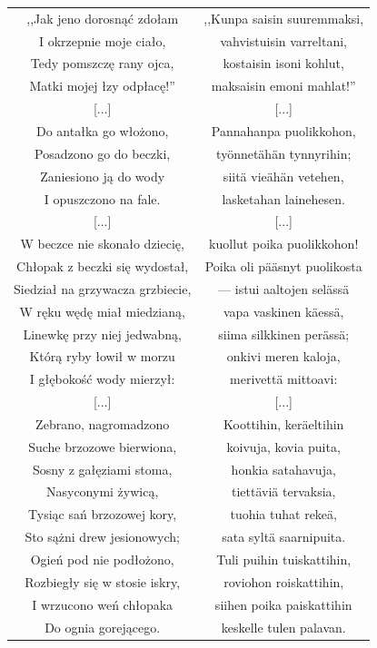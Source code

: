 \documentclass[11pt,a4paper,twoside]{report}
\begin{document}
{\centering
\small
\begin{longtable}{c c}
,,Jak jeno dorosnąć zdołam & ,,Kunpa saisin suuremmaksi, \\
I okrzepnie moje ciało, & vahvistuisin varreltani, \\
Tedy pomszczę rany ojca, & kostaisin isoni kohlut, \\
Matki mojej łzy odpłacę!'' & maksaisin emoni mahlat!'' \\
{[...]} & {[...]} \\
Do antałka go włożono, & Pannahanpa puolikkohon, \\
Posadzono go do beczki, & työnnetähän tynnyrihin; \\
Zaniesiono ją do wody & siitä vieähän vetehen, \\
I opuszczono na fale. & lasketahan lainehesen. \\
{[...]} & {[...]} \\
W beczce nie skonało dziecię, & kuollut poika puolikkohon! \\
Chłopak z beczki się wydostał, & Poika oli pääsnyt puolikosta \\
Siedział na grzywacza grzbiecie, & --- istui aaltojen selässä \\
W ręku wędę miał miedzianą, & vapa vaskinen käessä,\\
Linewkę przy niej jedwabną, & siima silkkinen perässä;\\
Którą ryby łowił w morzu & onkivi meren kaloja,\\
I głębokość wody mierzył: & merivettä mittoavi:\\
{[...]} & {[...]} \\
Zebrano, nagromadzono & Koottihin, keräeltihin \\
Suche brzozowe bierwiona, & koivuja, kovia puita, \\
Sosny z gałęziami stoma, & honkia satahavuja, \\
Nasyconymi żywicą, & tiettäviä tervaksia, \\
Tysiąc sań brzozowej kory, & tuohia tuhat rekeä, \\
Sto sążni drew jesionowych; & sata syltä saarnipuita. \\
Ogień pod nie podłożono, & Tuli puihin tuiskattihin, \\
Rozbiegły się w stosie iskry, & roviohon roiskattihin, \\
I wrzucono weń chłopaka & siihen poika paiskattihin \\
Do ognia gorejącego. & keskelle tulen palavan. \\

\end{longtable}}
\end{document}
